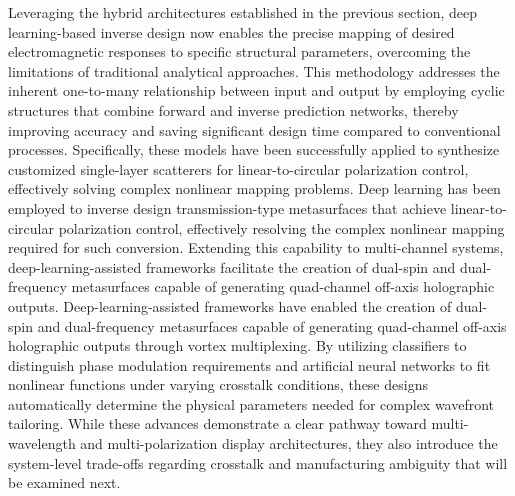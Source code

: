 Leveraging the hybrid architectures established in the previous section, deep learning-based inverse design now enables the precise mapping of desired electromagnetic responses to specific structural parameters, overcoming the limitations of traditional analytical approaches. This methodology addresses the inherent one-to-many relationship between input and output by employing cyclic structures that combine forward and inverse prediction networks, thereby improving accuracy and saving significant design time compared to conventional processes. Specifically, these models have been successfully applied to synthesize customized single-layer scatterers for linear-to-circular polarization control, effectively solving complex nonlinear mapping problems. Deep learning has been employed to inverse design transmission-type metasurfaces that achieve linear-to-circular polarization control, effectively resolving the complex nonlinear mapping required for such conversion. \citep{doi_10_1088_1361_6463_acefdf_20072f6c} Extending this capability to multi-channel systems, deep-learning-assisted frameworks facilitate the creation of dual-spin and dual-frequency metasurfaces capable of generating quad-channel off-axis holographic outputs. Deep-learning-assisted frameworks have enabled the creation of dual-spin and dual-frequency metasurfaces capable of generating quad-channel off-axis holographic outputs through vortex multiplexing. \citep{doi_10_1117_1_apn_2_1_016010_57069347} By utilizing classifiers to distinguish phase modulation requirements and artificial neural networks to fit nonlinear functions under varying crosstalk conditions, these designs automatically determine the physical parameters needed for complex wavefront tailoring. While these advances demonstrate a clear pathway toward multi-wavelength and multi-polarization display architectures, they also introduce the system-level trade-offs regarding crosstalk and manufacturing ambiguity that will be examined next. \citep{doi_10_1088_1361_6463_acefdf_20072f6c} \citep{doi_10_1117_1_apn_2_1_016010_57069347}

